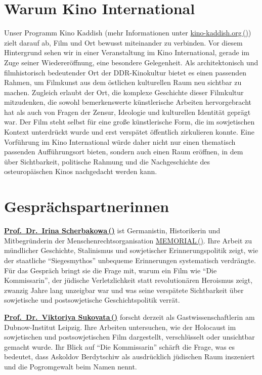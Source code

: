 \documentclass[11pt,a4paper]{article}
\newcommand{\linkicon}{\raisebox{0.15ex}{\scriptsize\faLink}}
\newcommand{\extlink}[2]{\href{#2}{\textcolor{linkblue}{#1\,(\linkicon)}}}
\begin{document}
\section*{Warum Kino International}

Unser Programm Kino Kaddish (mehr Informationen unter \extlink{kino-kaddish.org}{https://kino-kaddish.org}) zielt darauf ab, Film und Ort bewusst miteinander zu verbinden. Vor diesem Hintergrund sehen wir in einer Veranstaltung im Kino International, gerade im Zuge seiner Wiederer\"offnung, eine besondere Gelegenheit. Als architektonisch und filmhistorisch bedeutender Ort der DDR-Kinokultur bietet es einen passenden Rahmen, um Filmkunst aus dem \"ostlichen kulturellen Raum neu sichtbar zu machen. Zugleich erlaubt der Ort, die komplexe Geschichte dieser Filmkultur mitzudenken, die sowohl bemerkenswerte k\"unstlerische Arbeiten hervorgebracht hat als auch von Fragen der Zensur, Ideologie und kulturellen Identit\"at gepr\"agt war. Der Film steht selbst f\"ur eine gro{\ss}e k\"unstlerische Form, die im sowjetischen Kontext unterdr\"uckt wurde und erst versp\"atet \"offentlich zirkulieren konnte. Eine Vorf\"uhrung im Kino International w\"urde daher nicht nur einen thematisch passenden Auff\"uhrungsort bieten, sondern auch einen Raum er\"offnen, in dem \"uber Sichtbarkeit, politische Rahmung und die Nachgeschichte des osteurop\"aischen Kinos nachgedacht werden kann.

\section*{Gespr\"achspartnerinnen}

\textbf{\extlink{Prof.\ Dr.\ Irina Scherbakowa}{https://www.zfl-berlin.org/person/scherbakowa.html}} ist Germanistin, Historikerin und Mitbegr\"underin der Menschenrechtsorganisation \extlink{MEMORIAL}{https://www.memorial.de/}. Ihre Arbeit zu m\"undlicher Geschichte, Stalinismus und sowjetischer Erinnerungspolitik zeigt, wie der staatliche \enquote{Siegesmythos} unbequeme Erinnerungen systematisch verdr\"angte. F\"ur das Gespr\"ach bringt sie die Frage mit, warum ein Film wie \enquote{Die Kommissarin}, der j\"udische Verletzlichkeit statt revolution\"aren Heroismus zeigt, zwanzig Jahre lang unzeigbar war und was seine versp\"atete Sichtbarkeit \"uber sowjetische und postsowjetische Geschichtspolitik verr\"at.

\textbf{\extlink{Prof.\ Dr.\ Viktoriya Sukovata}{https://www.dubnow.de/person/prof-dr-victoryia-a-sukovata}} forscht derzeit als Gastwissenschaftlerin am Dubnow-Institut Leipzig. Ihre Arbeiten untersuchen, wie der Holocaust im sowjetischen und postsowjetischen Film dargestellt, verschl\"usselt oder unsichtbar gemacht wurde. Ihr Blick auf \enquote{Die Kommissarin} sch\"arft die Frage, was es bedeutet, dass Askoldov Berdytschiw als ausdr\"ucklich j\"udischen Raum inszeniert und die Pogromgewalt beim Namen nennt.
\end{document}

